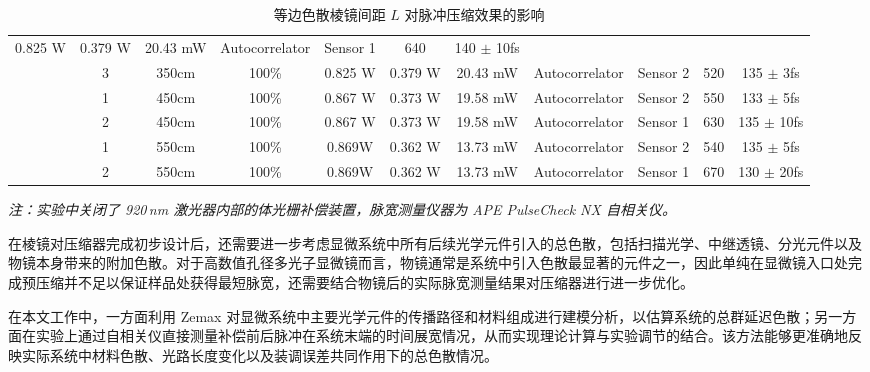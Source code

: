 \begin{table}[htbp]
{\begin{tabular}{ccccccccccc}
  0.825 W &
  0.379 W &
  20.43 mW &
  Autocorrelator &
  Sensor 1 &
  640 &
  140 $\pm$ 10fs \\
\rowcolor[HTML]{E7EAED} 
\multirow{-3}{*}{\cellcolor[HTML]{E7EAED}2} &
  3 &
  \cellcolor[HTML]{83CBEB}350cm &
  100\% &
  0.825 W &
  0.379 W &
  20.43 mW &
  Autocorrelator &
  Sensor 2 &
  520 &
  135 $\pm$ 3fs \\ \hline
\rowcolor[HTML]{E7EAED} 
\cellcolor[HTML]{E7EAED} &
  1 &
  \cellcolor[HTML]{E59EDD}450cm &
  100\% &
  0.867 W &
  0.373 W &
  19.58 mW &
  Autocorrelator &
  Sensor 2 &
  550 &
  133 $\pm$ 5fs \\
\rowcolor[HTML]{E7EAED} 
\multirow{-2}{*}{\cellcolor[HTML]{E7EAED}3} &
  2 &
  \cellcolor[HTML]{E59EDD}450cm &
  100\% &
  0.867 W &
  0.373 W &
  19.58 mW &
  Autocorrelator &
  Sensor 1 &
  630 &
  135 $\pm$ 10fs \\ \hline
\rowcolor[HTML]{E7EAED} 
\cellcolor[HTML]{E7EAED} &
  1 &
  \cellcolor[HTML]{8ED973}550cm &
  100\% &
  0.869W &
  0.362 W &
  13.73 mW &
  Autocorrelator &
  Sensor 2 &
  540 &
  135 $\pm$ 5fs \\
\rowcolor[HTML]{E7EAED} 
\multirow{-2}{*}{\cellcolor[HTML]{E7EAED}4} &
  2 &
  \cellcolor[HTML]{8ED973}550cm &
  100\% &
  0.869W &
  0.362 W &
  13.73 mW &
  Autocorrelator &
  Sensor 1 &
  670 &
  130 $\pm$ 20fs \\ \hline
\end{tabular}%
}
\caption{等边色散棱镜间距 $L$ 对脉冲压缩效果的影响}
\label{Table2}
\vspace{2mm}
\begin{minipage}{\textwidth}
\footnotesize
\textit{注：实验中关闭了 920\,nm 激光器内部的体光栅补偿装置，脉宽测量仪器为 APE PulseCheck NX 自相关仪。}
\end{minipage}
\end{table}

在棱镜对压缩器完成初步设计后，还需要进一步考虑显微系统中所有后续光学元件引入的总色散，包括扫描光学、中继透镜、分光元件以及物镜本身带来的附加色散。对于高数值孔径多光子显微镜而言，物镜通常是系统中引入色散最显著的元件之一，因此单纯在显微镜入口处完成预压缩并不足以保证样品处获得最短脉宽，还需要结合物镜后的实际脉宽测量结果对压缩器进行进一步优化。

在本文工作中，一方面利用 Zemax 对显微系统中主要光学元件的传播路径和材料组成进行建模分析，以估算系统的总群延迟色散；另一方面在实验上通过自相关仪直接测量补偿前后脉冲在系统末端的时间展宽情况，从而实现理论计算与实验调节的结合。该方法能够更准确地反映实际系统中材料色散、光路长度变化以及装调误差共同作用下的总色散情况。

